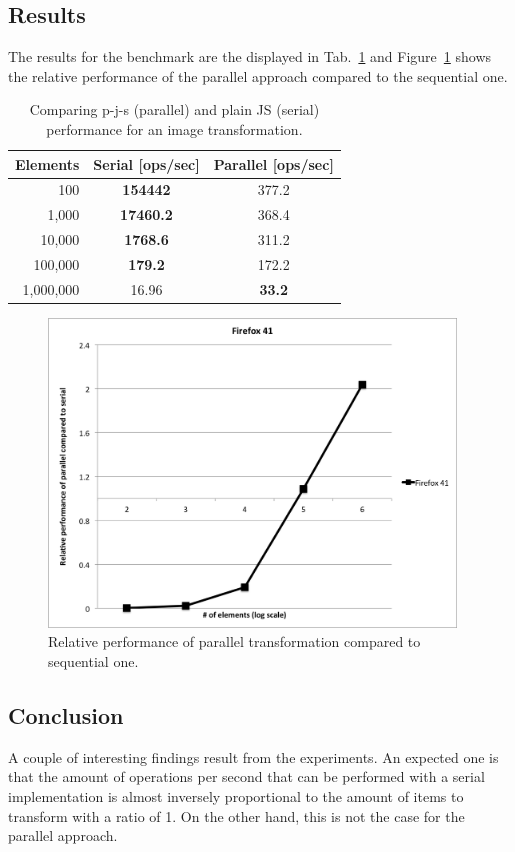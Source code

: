 \documentclass[runningheads,a4paper]{llncs}
\begin{document}
\subsection{Results}
The results for the benchmark are the displayed in Tab.~\ref{tab:benchmark} and Figure~\ref{fig:relative} shows the relative performance of the parallel approach compared to the sequential one.
\begin{table}
  \centering
  \begin{tabular}{|r|c|c|}
    \hline
    Elements & Serial [ops/sec] & Parallel [ops/sec] \\
    \hline
    100 & \textbf{154442} & 377.2\\
    1,000 & \textbf{17460.2} &  368.4 \\
    10,000 & \textbf{1768.6} & 311.2 \\
    100,000 & \textbf{179.2} & 172.2 \\
    1,000,000 & 16.96 & \textbf{33.2} \\
    \hline
  \end{tabular}
  \caption{Comparing p-j-s (parallel) and plain JS (serial) performance for an image transformation.}
  \label{tab:benchmark}
\end{table}

\begin{figure}
\centering
\includegraphics[height=8.2cm]{comparison}
\caption{Relative performance of parallel transformation compared to sequential one.}
\label{fig:relative}
\end{figure}

\subsection{Conclusion}
A couple of interesting findings result from the experiments. An expected one is that the amount of operations per second that can be performed with a serial implementation is almost inversely proportional to the amount of items to transform with a ratio of 1. On the other hand, this is not the case for the parallel approach.
\end{document}

